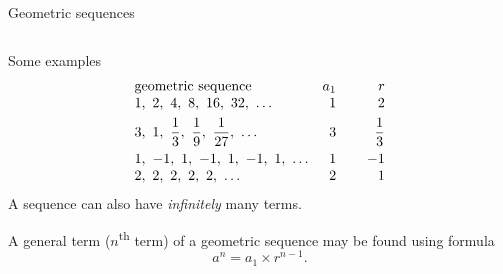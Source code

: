 \documentclass[9pt,aspectratio=169]{beamer}
\begin{document}
\begin{frame}{Geometric sequences}
\begin{columns}[T]
\begin{column}{0.5\textwidth}
      Some examples
      \[
        \begin{array}{l r r}
          \text{geometric sequence}\hspace*{3em} & a_1 & \hspace*{2em}r \\
          1,\ 2,\ 4,\ 8,\ 16,\ 32,\ \ldots & 1 & 2 \\[0.4em]
          3,\ 1,\ \dfrac{1}{3},\ \dfrac{1}{9},\ \dfrac{1}{27},\ \ldots & 3 & \dfrac{1}{3} \\[0.7em]
          1,\ -1,\ 1,\ -1,\ 1,\ -1,\ 1,\ \ldots & 1 & -1 \\
          2,\ 2,\ 2,\ 2,\ 2,\ \ldots & 2 & 1
        \end{array}
      \]
      A sequence can also have \emph{infinitely} many terms.

      \begin{definition}
        A general term ($n$\textsuperscript{th} term) of a geometric sequence may be found using formula
        \[ a^n = a_1 × r^{n-1}. \]
        \vspace*{-1\baselineskip}
      \end{definition}
    \end{column}
  \end{columns}
\end{frame}
\end{document}
